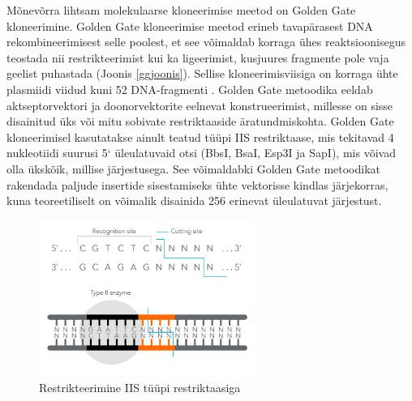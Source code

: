 \documentclass{trkut}%
\begin{document}
Mõnevõrra lihtsam molekulaarse kloneerimise meetod on Golden Gate kloneerimine. Golden Gate kloneerimise meetod erineb tavapärasest DNA rekombineerimisest selle poolest, et see võimaldab korraga ühes reaktsioonisegus teostada nii restrikteerimist kui ka ligeerimist, kusjuures fragmente pole vaja geelist puhastada (Joonis \ref{ggjoonis}). \parencite{ggkloneerimine} Sellise kloneerimisviisiga on korraga ühte plasmiidi viidud kuni 52 DNA-fragmenti \parencite{gg52}. Golden Gate metoodika eeldab aktseptorvektori ja doonorvektorite eelnevat konstrueerimist, millesse on sisse disainitud üks või mitu sobivate restriktaaside äratundmiskohta. Golden Gate kloneerimisel kasutatakse ainult teatud tüüpi IIS restriktaase, mis tekitavad 4 nukleotiidi suurusi 5‘ üleulatuvaid otsi (BbsI, BsaI, Esp3I ja SapI), mis võivad olla ükskõik, millise järjestusega. See võimaldabki Golden Gate metoodikat rakendada paljude insertide sisestamiseks ühte vektorisse kindlas järjekorras, kuna teoreetiliselt on võimalik disainida 256 erinevat üleulatuvat järjestust. \parencite{256}

\begin{figure}[htbp]
	\includegraphics[width=7cm]{restriction-enzyme_s-recognition-site-differs-from-its-cutting-site.png}
	\caption{Restrikteerimine IIS tüüpi restriktaasiga}
	\label{restriktaas}
\end{figure}
\end{document}
